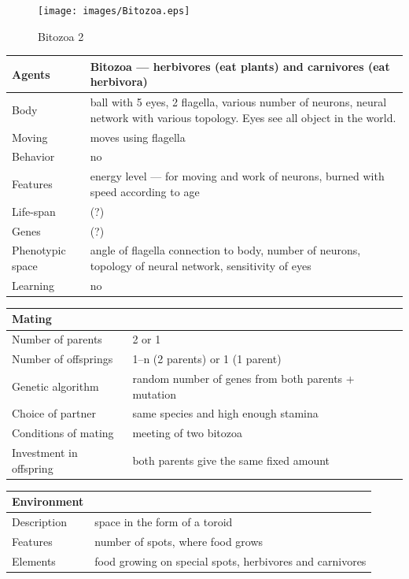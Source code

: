 \documentclass[a4paper,12pt]{report}
\begin{document}
\begin{figure}
\begin{center}
  \texttt{[image: images/Bitozoa.eps]}
  \caption{Bitozoa 2}
  \label{img.Bitozoa}
\end{center}
\end{figure}

\vspace{20pt}
\begin{tabular}{|p{150pt}|p{220pt}|}
\hline
\textbf{Agents}&Bitozoa --- herbivores (eat plants) and carnivores (eat herbivora)\\ \hline
Body&ball with 5 eyes, 2 flagella, various number of neurons, neural network with various topology. Eyes see all object in the world.\\ \hline
Moving&moves using flagella\\ \hline
Behavior&no\\ \hline
Features&energy level --- for moving and work of neurons, burned with speed according to age \\ \hline
Life-span&(?)\\ \hline
Genes&(?)\\ \hline
Phenotypic space&angle of flagella connection to body, number of neurons, topology of neural network, sensitivity of eyes\\ \hline
Learning&no\\ \hline
\end{tabular} 

\vspace{10pt}
\begin{tabular}{|p{150pt}|p{220pt}|}
\hline 	\textbf  {Mating}&\\ \hline
Number of parents&2 or 1\\ \hline
Number of offsprings&1--n (2 parents) or 1 (1 parent)\\ \hline
Genetic algorithm&random number of genes from both parents + mutation\\ \hline
Choice of partner&same species and high enough stamina\\ \hline
Conditions of mating&meeting of two bitozoa \\ \hline
Investment in offspring&both parents give the same fixed amount\\ \hline
\end{tabular} 

\vspace{10pt}
\begin{tabular}{|p{150pt}|p{220pt}|}
\hline 	\textbf  {Environment}&\\ \hline
Description&space in the form of a toroid\\ \hline
Features&number of spots, where food grows\\ \hline
Elements&food growing on special spots, herbivores and carnivores\\ \hline
\end{tabular}
 
\end{document}
